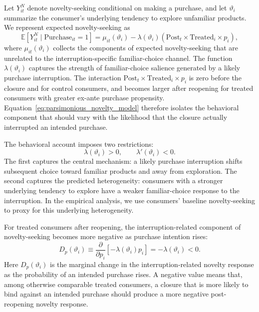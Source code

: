 \documentclass[11 pt]{article}
\begin{document}
Let $Y^N_{it}$ denote novelty-seeking conditional on making a purchase, and let $\vartheta_i$ summarize the consumer's underlying tendency to explore unfamiliar products. We represent expected novelty-seeking as
\begin{equation}
\mathbb{E}\left[
Y^N_{it}\mid\text{Purchase}_{it}=1
\right]
=
\mu_{it}(\vartheta_i)
-
\lambda(\vartheta_i)
\left(
\text{Post}_{t}
\times
\text{Treated}_{i}
\times
p_i
\right),
\label{eq:parsimonious_novelty_model}
\end{equation}
where $\mu_{it}(\vartheta_i)$ collects the components of expected novelty-seeking that are unrelated to the interruption-specific familiar-choice channel. The function $\lambda(\vartheta_i)$ captures the strength of familiar-choice salience generated by a likely purchase interruption. The interaction $\text{Post}_{t}\times\text{Treated}_{i}\times p_i$ is zero before the closure and for control consumers, and becomes larger after reopening for treated consumers with greater ex-ante purchase propensity. Equation~\eqref{eq:parsimonious_novelty_model} therefore isolates the behavioral component that should vary with the likelihood that the closure actually interrupted an intended purchase.

The behavioral account imposes two restrictions:
\begin{equation}
\lambda(\vartheta_i)>0,
\qquad
\lambda'(\vartheta_i)<0.
\label{eq:parsimonious_lambda}
\end{equation}
The first captures the central mechanism: a likely purchase interruption shifts subsequent choice toward familiar products and away from exploration. The second captures the predicted heterogeneity: consumers with a stronger underlying tendency to explore have a weaker familiar-choice response to the interruption. In the empirical analysis, we use consumers' baseline novelty-seeking to proxy for this underlying heterogeneity.

For treated consumers after reopening, the interruption-related component of novelty-seeking becomes more negative as purchase intention rises:
\begin{equation}
D_p(\vartheta_i)
\equiv
\frac{\partial}{\partial p_i}
\left[-\lambda(\vartheta_i)p_i\right]
=
-\lambda(\vartheta_i)
<0.
\label{eq:parsimonious_main_prediction}
\end{equation}
Here $D_p(\vartheta_i)$ is the marginal change in the interruption-related novelty response as the probability of an intended purchase rises. A negative value means that, among otherwise comparable treated consumers, a closure that is more likely to bind against an intended purchase should produce a more negative post-reopening novelty response.
\end{document}
